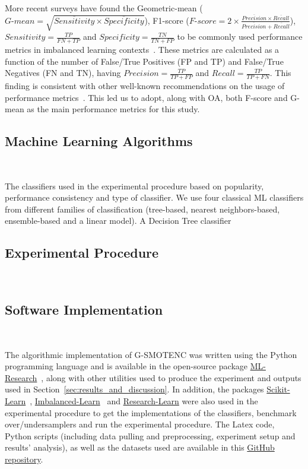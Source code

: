 \documentclass[parskip=full]{scrartcl}
\begin{document}
More recent surveys have found the Geometric-mean ($\textit{G-mean} =
\sqrt{\overline{Sensitivity} \times \overline{Specificity}}$), F1-score
($\textit{F-score}=2\times\frac{\overline{Precision} \times
\overline{Recall}}{\overline{Precision} + \overline{Recall}}$), $Sensitivity =
\frac{TP}{FN+TP}$ and $Specificity = \frac{TN}{TN + FP}$ to be commonly used
performance metrics in imbalanced learning contexts~\cite{rout2018handling}.
These metrics are calculated as a function of the number of False/True
Positives (FP and TP) and False/True Negatives (FN and TN), having
$Precision = \frac{TP}{TP+FP}$ and $Recall = \frac{TP}{TP+FN}$.
This finding is consistent with other well-known recommendations on the usage
of performance metrics~\cite{jeni2013facing}. This led us to adopt, along with
OA, both F-score and G-mean as the main performance metrics for this study. 

\subsection{Machine Learning Algorithms}~\label{sec:ml_algorithms}

The classifiers used in the experimental procedure based on popularity,
performance consistency and type of classifier. We use four classical ML
classifiers from different families of classification (tree-based, nearest
neighbors-based, ensemble-based and a linear model). A Decision Tree classifier

\subsection{Experimental Procedure}~\label{sec:experimental_procedure}

\subsection{Software Implementation}~\label{sec:software_implementation}

The algorithmic implementation of G-SMOTENC was written using the Python
programming language and is available in the open-source package
\href{https://github.com/joaopfonseca/ml-research}{ML-Research}~\cite{fonseca2021increasing},
along with other utilities used to produce the experiment and outputs used in
Section~\ref{sec:results_and_discussion}. In addition, the packages
\href{https://github.com/scikit-learn/scikit-learn/}{Scikit-Learn}~\cite{scikit-learn},
\href{https://github.com/scikit-learn-contrib/imbalanced-learn}{Imbalanced-Learn}~\cite{JMLR:v18:16-365}
and \href{https://github.com/georgedouzas/research-learn/}{Research-Learn}
were also used in the experimental procedure to get the implementations of the
classifiers, benchmark over/undersamplers and run the experimental procedure.
The Latex code, Python scripts (including data pulling and preprocessing,
experiment setup and results' analysis), as well as the datasets used are
available in this \href{https://github.com/joaopfonseca/publications}{GitHub
repository}.
 
\end{document}
